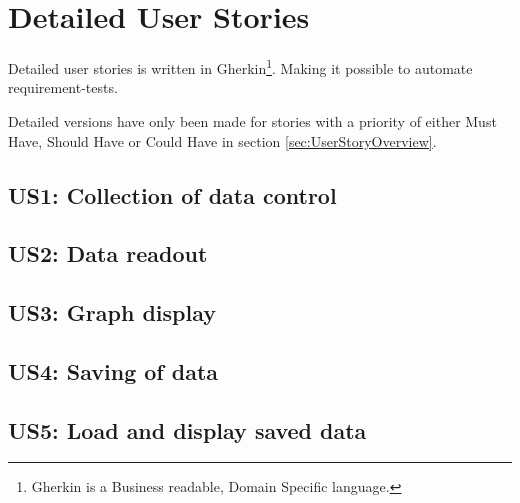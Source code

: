 \section{Detailed User Stories}

Detailed user stories is written in Gherkin\footnote{Gherkin is a Business readable, Domain Specific language.}\cite{GherkinDescription}. Making it possible to automate requirement-tests.

Detailed versions have only been made for stories with a priority of either Must Have, Should Have or Could Have in section \vref{sec:UserStoryOverview}.

\subsection{US1: Collection of data control}


\subsection{US2: Data readout}


\subsection{US3: Graph display}


\subsection{US4: Saving of data}


\subsection{US5: Load and display saved data}

